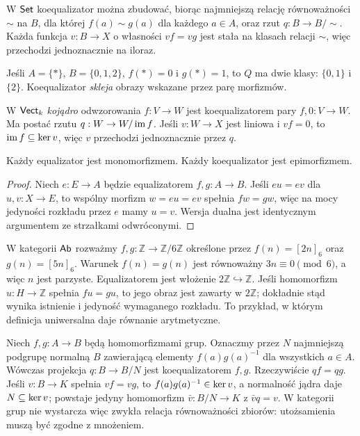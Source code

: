 \begin{przyklad}
W $\mathsf{Set}$ koequalizator można zbudować, biorąc najmniejszą relację równoważności $\sim$ na $B$, dla której $f(a)\sim g(a)$ dla każdego $a\in A$, oraz rzut $q:B\to B/{\sim}$. Każda funkcja $v:B\to X$ o własności $vf=vg$ jest stała na klasach relacji $\sim$, więc przechodzi jednoznacznie na iloraz.

Jeśli $A=\{*\}$, $B=\{0,1,2\}$, $f(*)=0$ i $g(*)=1$, to $Q$ ma dwie klasy: $\{0,1\}$ i $\{2\}$. Koequalizator \emph{skleja} obrazy wskazane przez parę morfizmów.
\end{przyklad}

\begin{przyklad}[Kojądro]
W $\mathsf{Vect}_k$ \emph{kojądro} odwzorowania $f:V\to W$ jest koequalizatorem pary $f,0:V\to W$. Ma postać rzutu $q:W\to W/\operatorname{im} f$. Jeśli $v:W\to X$ jest liniowa i $vf=0$, to $\operatorname{im} f\subseteq\operatorname{ker} v$, więc $v$ przechodzi jednoznacznie przez $q$.
\end{przyklad}

\begin{stwierdzenie}
Każdy equalizator jest monomorfizmem. Każdy koequalizator jest epimorfizmem.
\end{stwierdzenie}
\begin{proof}
Niech $e:E\to A$ będzie equalizatorem $f,g:A\to B$. Jeśli $eu=ev$ dla $u,v:X\to E$, to wspólny morfizm $w=eu=ev$ spełnia $fw=gw$, więc na mocy jedyności rozkładu przez $e$ mamy $u=v$. Wersja dualna jest identycznym argumentem ze strzałkami odwróconymi.
\end{proof}


\begin{przyklad}
W kategorii $\mathsf{Ab}$ rozważmy $f,g:\mathbb Z\to\mathbb Z/6\mathbb Z$ określone przez $f(n)=[2n]_6$ oraz $g(n)=[5n]_6$. Warunek $f(n)=g(n)$ jest równoważny $3n\equiv0\pmod 6$, a więc $n$ jest parzyste. Equalizatorem jest włożenie $2\mathbb Z\hookrightarrow\mathbb Z$. Jeśli homomorfizm $u:H\to\mathbb Z$ spełnia $fu=gu$, to jego obraz jest zawarty w $2\mathbb Z$; dokładnie stąd wynika istnienie i jedyność wymaganego rozkładu. To przykład, w którym definicja uniwersalna daje równanie arytmetyczne.
\end{przyklad}

\begin{przyklad}
Niech $f,g:A\to B$ będą homomorfizmami grup. Oznaczmy przez $N$ najmniejszą podgrupę normalną $B$ zawierającą elementy $f(a)g(a)^{-1}$ dla wszystkich $a\in A$. Wówczas projekcja $q:B\to B/N$ jest koequalizatorem $f,g$. Rzeczywiście $qf=qg$. Jeśli $v:B\to K$ spełnia $vf=vg$, to $f(a)g(a)^{-1}\in\operatorname{ker} v$, a normalność jądra daje $N\subseteq\operatorname{ker} v$; powstaje jedyny homomorfizm $\bar v:B/N\to K$ z $\bar vq=v$. W kategorii grup nie wystarcza więc zwykła relacja równoważności zbiorów: utożsamienia muszą być zgodne z mnożeniem.
\end{przyklad}


